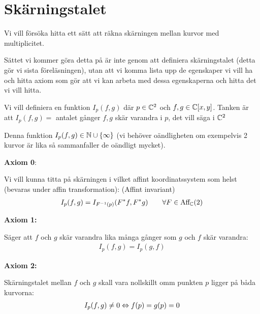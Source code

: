 \section{Skärningstalet}\par
\noindent Vi vill försöka hitta ett sätt att räkna skärningen mellan kurvor med multiplicitet.\par
\noindent Sättet vi kommer göra detta på är inte genom att definiera skärningstalet (detta gör vi sista föreläsningen), utan att vi komma lista upp de egenskaper vi vill ha och hitta axiom som gör att vi kan arbeta med dessa egenskaperna och hitta det vi vill hitta.
\par\bigskip
\noindent Vi vill definiera en funktion $I_p(f,g)$ där $p\in\mathbb{C}^2$ och $f,g\in\mathbb{C}[x,y]$. Tanken är att $I_p(f,g) =$ antalet gånger $f,g$ skär varandra i $p$, det vill säga i $\mathbb{C}^2$
\par\bigskip
\noindent Denna funktion $I_p(f,g)\in\mathbb{N}\cup\left\{\infty\right\}$ (vi behöver oändligheten om exempelvis 2 kurvor är lika så sammanfaller de oändligt mycket).
\par\bigskip
\noindent\textbf{Axiom 0}:\par
\noindent Vi vill kunna titta på skärningen i vilket affint koordinatssystem som helst (bevaras under affin transformation): (Affint invariant)
\begin{equation*}
  \begin{gathered}
    I_p(f,g) = I_{F^{-1}(p)}(F^*f,F^*g)\qquad\forall F\in\text{Aff}_{\mathbb{C}}(2)
  \end{gathered}
\end{equation*}
\par\bigskip
\noindent\textbf{Axiom 1:}\par
\noindent Säger att $f$ och $g$ skär varandra lika många gånger som $g$ och $f$ skär varandra:
\begin{equation*}
  \begin{gathered}
    I_p(f,g) = I_p(g,f)
  \end{gathered}
\end{equation*}
\par\bigskip
\noindent\textbf{Axiom 2:}\par
\noindent Skärningstalet mellan $f$ och $g$ skall vara nollskillt omm punkten $p$ ligger på båda kurvorna:
\begin{equation*}
  \begin{gathered}
    I_p(f,g)\neq0\Leftrightarrow f(p) = g(p) = 0
  \end{gathered}
\end{equation*}
